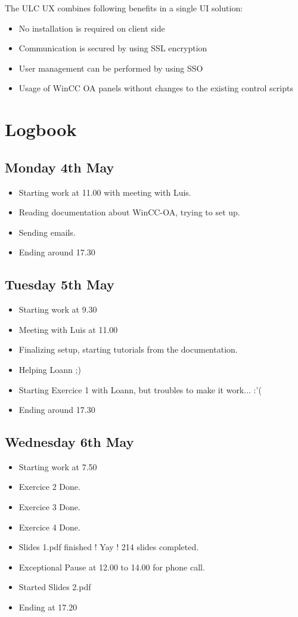 \documentclass[a4paper, 10pt]{article}
\begin{document}
The ULC UX combines following benefits in a single UI solution:
\begin{itemize}
    \item No installation is required on client side
    \item Communication is secured by using SSL encryption
    \item User management can be performed by using SSO
    \item Usage of WinCC OA panels without changes to the existing control scripts
\end{itemize}

\newpage
\footnotesize
\section{Logbook}
\subsection*{Monday 4th May}
\begin{itemize}
    \item Starting work at 11.00 with meeting with Luis.
    \item Reading documentation about WinCC-OA, trying to set up.
    \item Sending emails.
    \item Ending around 17.30
\end{itemize}

\subsection*{Tuesday 5th May}
\begin{itemize}
    \item Starting work at 9.30
    \item Meeting with Luis at 11.00 
    \item Finalizing setup, starting tutorials from the documentation.
    \item Helping Loann ;)
    \item Starting Exercice 1 with Loann, but troubles to make it work... :'(
    \item Ending around 17.30
\end{itemize}

\subsection*{Wednesday 6th May}
\begin{itemize}
    \item Starting work at 7.50
    \item Exercice 2 Done.
    \item Exercice 3 Done.
    \item Exercice 4 Done.
    \item Slides 1.pdf finished ! Yay ! 214 slides completed.
    \item Exceptional Pause at 12.00 to 14.00 for phone call.
    \item Started Slides 2.pdf
    \item Ending at 17.20
\end{itemize}
\end{document}
